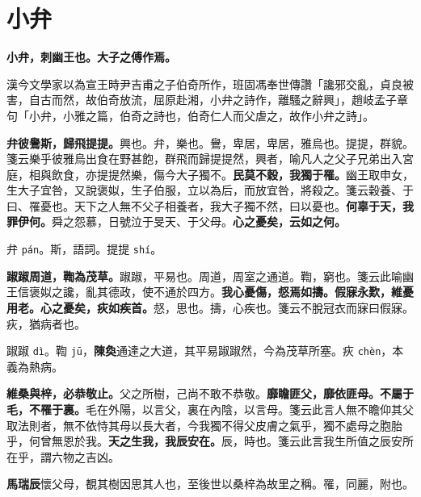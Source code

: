 \section{小弁}


\textbf{小弁，刺幽王也。大子之傅作焉。}

\begin{quoting}漢今文學家以為宣王時尹吉甫之子伯奇所作，班固馮奉世傳讚「讒邪交亂，貞良被害，自古而然，故伯奇放流，屈原赴湘，小弁之詩作，離騷之辭興」，趙岐孟子章句「小弁，小雅之篇，伯奇之詩也，伯奇仁人而父虐之，故作小弁之詩」。\end{quoting}

\textbf{弁彼鸒斯，歸飛提提。}{\footnotesize 興也。弁，樂也。鸒，卑居，卑居，雅烏也。提提，群貌。箋云樂乎彼雅烏出食在野甚飽，群飛而歸提提然，興者，喻凡人之父子兄弟出入宮庭，相與飲食，亦提提然樂，傷今大子獨不。}\textbf{民莫不穀，我獨于罹。}{\footnotesize 幽王取申女，生大子宜咎，又說褒姒，生子伯服，立以為后，而放宜咎，將殺之。箋云穀養、于曰、罹憂也。天下之人無不父子相養者，我大子獨不然，曰以憂也。}\textbf{何辜于天，我罪伊何。}{\footnotesize 舜之怨慕，日號泣于旻天、于父母。}\textbf{心之憂矣，云如之何。}

\begin{quoting}弁 \texttt{pán}。斯，語詞。提提 \texttt{shí}。\end{quoting}

\textbf{踧踧周道，鞫為茂草。}{\footnotesize 踧踧，平易也。周道，周室之通道。鞫，窮也。箋云此喻幽王信褒姒之讒，亂其德政，使不通於四方。}\textbf{我心憂傷，惄焉如擣。假寐永歎，維憂用老。心之憂矣，疢如疾首。}{\footnotesize 惄，思也。擣，心疾也。箋云不脫冠衣而寐曰假寐。疢，猶病者也。}

\begin{quoting}踧踧 \texttt{dì}。鞫 \texttt{jū}，\textbf{陳奐}通達之大道，其平易踧踧然，今為茂草所塞。疢 \texttt{chèn}，本義為熱病。\end{quoting}

\textbf{維桑與梓，必恭敬止。}{\footnotesize 父之所樹，己尚不敢不恭敬。}\textbf{靡瞻匪父，靡依匪母。不屬于毛，不罹于裏。}{\footnotesize 毛在外陽，以言父，裏在內陰，以言母。箋云此言人無不瞻仰其父取法則者，無不依恃其母以長大者，今我獨不得父皮膚之氣乎，獨不處母之胞胎乎，何曾無恩於我。}\textbf{天之生我，我辰安在。}{\footnotesize 辰，時也。箋云此言我生所值之辰安所在乎，謂六物之吉凶。}

\begin{quoting}\textbf{馬瑞辰}懷父母，覩其樹因思其人也，至後世以桑梓為故里之稱。罹，同麗，附也。\end{quoting}

